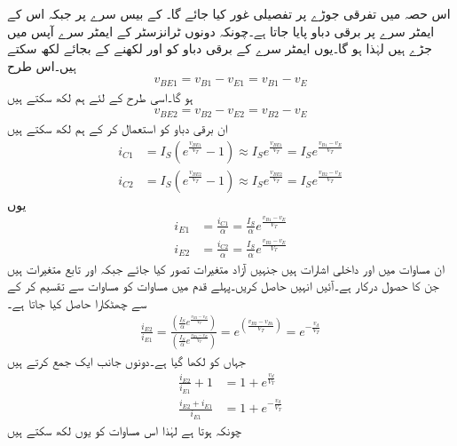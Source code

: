اس حصہ میں تفرقی جوڑے پر تفصیلی غور کیا جائے گا۔  کے بیس  سرے پر  جبکہ اس کے ایمٹر سرے پر  برقی دباو پایا جاتا ہے۔چونکہ دونوں ٹرانزسٹر کے ایمٹر سرے آپس میں جڑے ہیں لہٰذا  ہو گا۔یوں ایمٹر سرے کے برقی دباو کو  اور  لکھنے کے بجائے  لکھ سکتے ہیں۔اس طرح
\begin{align}
v_{BE1}=v_{B1}-v_{E1}=v_{B1}-v_E
\end{align}
ہو گا۔اسی طرح  کے لئے ہم لکھ سکتے ہیں
\begin{align}
v_{BE2}=v_{B2}-v_{E2}=v_{B2}-v_E
\end{align}
ان برقی دباو کو استعمال کر کے ہم لکھ سکتے ہیں
\begin{align}
i_{C1}&=I_S \left(e^{\frac{v_{BE1}}{V_T}}-1 \right ) \approx I_S e^{\frac{v_{BE1}}{V_T}} =I_S e^{\frac{v_{B1}-v_E}{V_T}}\\
i_{C2}&=I_S \left(e^{\frac{v_{BE2}}{V_T}}-1 \right ) \approx I_S e^{\frac{v_{BE2}}{V_T}} =I_S e^{\frac{v_{B2}-v_E}{V_T}}
\end{align}
یوں
\begin{align}
i_{E1}&=\frac{i_{C1}}{\alpha}=\frac{I_S}{\alpha} e^{\frac{v_{B1}-v_E}{V_T}} \label{مساوات_تفرقی_پہلی_رو_بالمقابل_دباو}\\
i_{E2}&=\frac{i_{C2}}{\alpha}=\frac{I_S}{\alpha} e^{\frac{v_{B2}-v_E}{V_T}} \label{مساوات_تفرقی_دوسری_رو_بالمقابل_دباو}
\end{align}
ان مساوات میں   اور  داخلی اشارات ہیں جنہیں آزاد متغیرات تصور کیا جائے  جبکہ  اور   تابع متغیرات ہیں جن کا حصول درکار ہے۔آئیں انہیں حاصل کریں۔پہلے قدم میں مساوات   کو مساوات   سے تقسیم کر کے  سے چھٹکارا حاصل کیا جاتا ہے۔
\begin{align}
\frac{i_{E2}}{i_{E1}}=\frac{\left(\frac{I_S}{\alpha} e^{\frac{v_{B2}-v_E}{V_T}}\right )}{\left(\frac{I_S}{\alpha} e^{\frac{v_{B1}-v_E}{V_T}}\right )}=e^{\left(\frac{v_{B2}-v_{B1}}{V_T} \right )}=e^{-\frac{v_d}{V_T}}
\end{align}
جہاں   کو  لکھا گیا ہے۔دونوں جانب ایک    جمع کرتے ہیں
\begin{align}
\frac{i_{E2}}{i_{E1}}+1&=1+ e^{\frac{v_d}{V_T}}\\
\frac{i_{E2}+i_{E1}}{i_{E1}}&=1+e^{-\frac{v_d}{V_T}}
\end{align}
چونکہ  ہوتا ہے لہٰذا اس مساوات کو یوں لکھ سکتے ہیں

